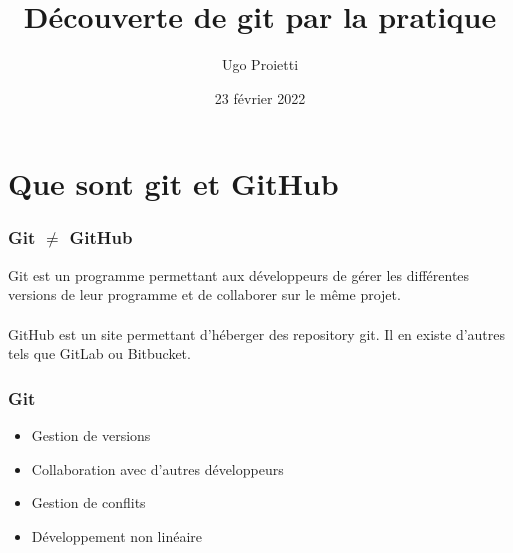 \documentclass{beamer}
\title[Github]{Découverte de git par la pratique} %
\author{Ugo Proietti} %
\institute[UMONS] %
{
Université de Mons \\ %
\medskip
\textit{ugo.proietti@student.umons.ac.be} %
}
\date{23 février 2022} %
\begin{document}
\begin{frame}
\titlepage %
\end{frame}

\begin{frame}
\frametitle{} %
\tableofcontents %
\end{frame}


\section{Que sont git et GitHub} %

\begin{frame}\frametitle{Git $\neq$ GitHub}
Git est un programme permettant aux développeurs de gérer les différentes versions de leur programme et de collaborer sur le même projet.\\~\\

GitHub est un site permettant d'héberger des repository git. Il en existe d'autres tels que GitLab ou Bitbucket.
\end{frame}


\begin{frame}\frametitle{Git}
\begin{itemize}
    \item Gestion de versions
    \item Collaboration avec d'autres développeurs
    \item Gestion de conflits
    \item Développement non linéaire
\end{itemize}
\end{frame}
\end{document}

